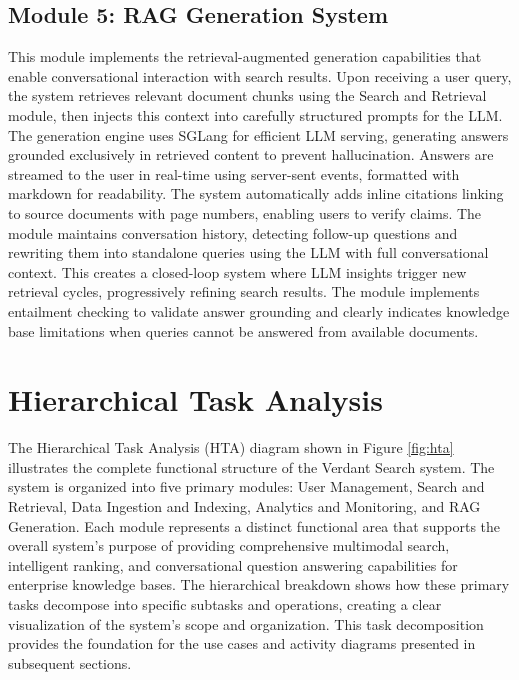 \subsection{Module 5: RAG Generation System}
This module implements the retrieval-augmented generation capabilities that enable conversational interaction with search results. Upon receiving a user query, the system retrieves relevant document chunks using the Search and Retrieval module, then injects this context into carefully structured prompts for the LLM. The generation engine uses SGLang for efficient LLM serving, generating answers grounded exclusively in retrieved content to prevent hallucination. Answers are streamed to the user in real-time using server-sent events, formatted with markdown for readability. The system automatically adds inline citations linking to source documents with page numbers, enabling users to verify claims. The module maintains conversation history, detecting follow-up questions and rewriting them into standalone queries using the LLM with full conversational context. This creates a closed-loop system where LLM insights trigger new retrieval cycles, progressively refining search results. The module implements entailment checking to validate answer grounding and clearly indicates knowledge base limitations when queries cannot be answered from available documents.

\clearpage

\section{Hierarchical Task Analysis}

The Hierarchical Task Analysis (HTA) diagram shown in Figure \ref{fig:hta} illustrates the complete functional structure of the Verdant Search system. The system is organized into five primary modules: User Management, Search and Retrieval, Data Ingestion and Indexing, Analytics and Monitoring, and RAG Generation. Each module represents a distinct functional area that supports the overall system's purpose of providing comprehensive multimodal search, intelligent ranking, and conversational question answering capabilities for enterprise knowledge bases. The hierarchical breakdown shows how these primary tasks decompose into specific subtasks and operations, creating a clear visualization of the system's scope and organization. This task decomposition provides the foundation for the use cases and activity diagrams presented in subsequent sections.

